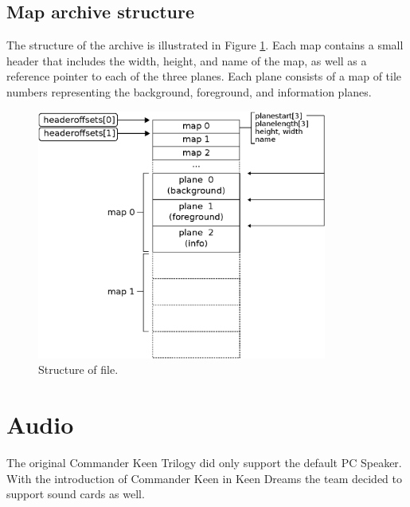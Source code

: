 \documentclass[book.tex]{subfiles}
\begin{document}
\pagebreak
 
\subsection{Map archive structure}
The structure of the  archive is illustrated in Figure \ref{fig:map-file}. Each map contains a small header that includes the width, height, and name of the map, as well as a reference pointer to each of the three planes. Each plane consists of a map of tile numbers representing the background, foreground, and information planes.\\

\par
\begin{minipage}{\textwidth}
 \par
 \end{minipage}
 
\par
\begin{figure}[H]
\centering
 \includegraphics[width=0.85\textwidth]{imgs/drawings/kdreams_map.eps}
 \caption{Structure of  file.}
 \label{fig:map-file}
\end{figure}

\section{Audio}
\label{section:audio}
The original Commander Keen Trilogy did only support the default PC Speaker. With the introduction of Commander Keen in Keen Dreams the team decided to support sound cards as well.\\
\end{document}
